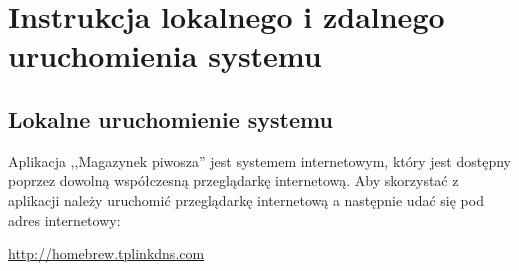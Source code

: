 \documentclass[12pt,a4paper]{article}
\begin{document}
	\newpage
		
	\section{Instrukcja lokalnego i zdalnego uruchomienia systemu}
		\subsection{Lokalne uruchomienie systemu}
			\indent Aplikacja ,,Magazynek piwosza'' jest systemem internetowym, który jest dostępny
			poprzez dowolną współczesną przeglądarkę internetową. Aby skorzystać z aplikacji należy
			uruchomić przeglądarkę internetową a następnie udać się pod adres internetowy:
				\begin{tcolorbox}[minipage,colback=white,arc=0pt,outer arc=0pt, fontupper=\scriptsize]
					\center					
					\url{http://homebrew.tplinkdns.com}
				\end{tcolorbox}
			
\end{document}
